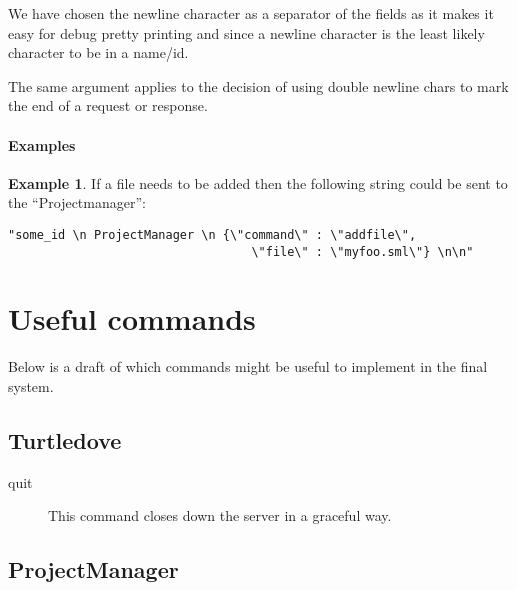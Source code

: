 \documentclass[a4paper, oneside, final]{memoir}
\theoremstyle{definition}
\newtheorem{example}{Example}
\begin{document}
We have chosen the newline character as a separator of the fields as it
makes it easy for debug pretty printing and since a newline character is the least
likely character to be in a name/id.

The same argument applies to the decision of using double newline chars to mark
the end of a request or response. 


\paragraph{Examples}



\begin{example} If a file needs to be added then the following string could be
  sent to the ``Projectmanager'':
\begin{verbatim}
"some_id \n ProjectManager \n {\"command\" : \"addfile\", 
                                  \"file\" : \"myfoo.sml\"} \n\n"
\end{verbatim}
\end{example}


\section*{Useful commands}

 Below is a draft of which commands might be useful to implement in the final system. 

\subsection*{Turtledove}

\begin{description}
\item[quit] This command closes down the server in a graceful way.
\end{description}

\subsection*{ProjectManager }
\end{document}
